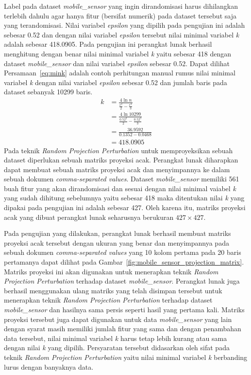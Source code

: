 Label pada dataset \textit{mobile\_sensor} yang ingin dirandomisasi harus dihilangkan terlebih dahulu agar hanya fitur (bersifat numerik) pada dataset tersebut saja yang terandomisasi. Nilai variabel \textit{epsilon} yang dipilih pada pengujian ini adalah sebesar 0.52 dan dengan nilai variabel \textit{epsilon} tersebut nilai minimal variabel \textit{k} adalah sebesar 418.0905. Pada pengujian ini perangkat lunak berhasil menghitung dengan benar nilai minimal variabel \textit{k} yaitu sebesar 418 dengan dataset \textit{mobile\_sensor} dan nilai variabel \textit{epsilon} sebesar 0.52. Dapat dilihat Persamaan~\ref{eq:mink} adalah contoh perhitungan manual rumus nilai minimal variabel \textit{k} dengan nilai variabel \textit{epsilon} sebesar 0.52 dan jumlah baris pada dataset sebanyak 10299 baris.
\begin{align}
	k &= \frac{4\ln{n}}{\frac{\epsilon^{2}}{2}-\frac{\epsilon^{3}}{3}} \label{eq:mink} \\
	&= \frac{4\ln{10299}}{\frac{0.52^{2}}{2}-\frac{0.52^{3}}{3}} \nonumber \\
	&= \frac{36.9592}{0.1352-0.0468} \nonumber \\
	&= 418.0905 \nonumber
\end{align}
Pada teknik \textit{Random Projection Perturbation} untuk memproyeksikan sebuah dataset diperlukan sebuah matriks proyeksi acak. Perangkat lunak diharapkan dapat membuat sebuah matriks proyeksi acak dan menyimpannya ke dalam sebuah dokumen \textit{comma-separated values}. Dataset \textit{mobile\_sensor} memiliki 561 buah fitur yang akan dirandomisasi dan sesuai dengan nilai minimal vaiabel \textit{k} yang sudah dihitung sebelumnya yaitu sebesar 418 maka ditentukan nilai \textit{k} yang dipakai pada pengujian ini adalah sebesar 427. Oleh karena itu, matriks proyeksi acak yang dibuat perangkat lunak seharusnya berukuran \(427\times427\).

Pada pengujian yang dilakukan, perangkat lunak berhasil membuat matriks proyeksi acak tersebut dengan ukuran yang benar dan menyimpannya pada sebuah dokumen \textit{comma-separated values} yang 10 kolom pertama pada 20 baris pertamanya dapat dilihat pada Gambar~\ref{fig:mobile_sensor_projection_matrix}. Matriks proyeksi ini akan digunakan untuk menerapkan teknik \textit{Random Projection Perturbation} terhadap dataset \textit{mobile\_sensor}. Perangkat lunak juga berhasil menggunakan ulang matriks yang telah disimpan tersebut untuk menerapkan teknik \textit{Random Projection Perturbation} terhadap dataset \textit{mobile\_sensor} dan hasilnya sama persis seperti hasil yang pertama kali. Matriks proyeksi tersebut juga dapat digunakan untuk data \textit{mobile\_sensor} yang lain dengan syarat masih memiliki jumlah fitur yang sama dan dengan penambahan data tersebut, nilai minimal variabel \textit{k} harus tetap lebih kurang atau sama dengan nilai \textit{k} yang dipilih. Persyaratan tersebut didasarkan oleh sifat pada teknik \textit{Random Projection Perturbation} yaitu nilai minimal variabel \textit{k} berbanding lurus dengan banyaknya data.

